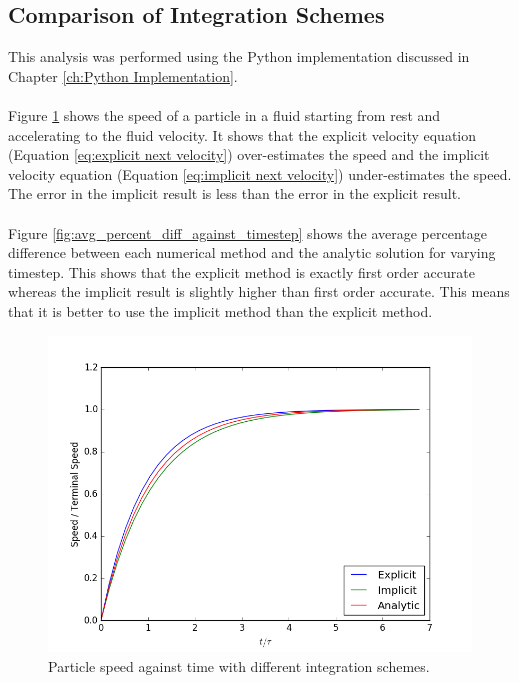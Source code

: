 \documentclass[a4paper,11pt,titlepage]{report}
\begin{document}
\subsection{Comparison of Integration Schemes}
\label{sec:integration scheme comparison}
This analysis was performed using the Python implementation discussed in Chapter \ref{ch:Python Implementation}.
\\\\Figure \ref{fig:terminal_velocity_implicit_explicit} shows the speed of a particle in a fluid starting from rest and accelerating to the fluid velocity. It shows that the explicit velocity equation (Equation \ref{eq:explicit next velocity}) over-estimates the speed and the implicit velocity equation (Equation \ref{eq:implicit next velocity}) under-estimates the speed. The error in the implicit result is less than the error in the explicit result.
\\\\Figure \ref{fig:avg_percent_diff_against_timestep} shows the average percentage difference between each numerical method and the analytic solution for varying timestep. This shows that the explicit method is exactly first order accurate whereas the implicit result is slightly higher than first order accurate. This means that it is better to use the implicit method than the explicit method.
\begin{figure}[!htb]
\centering
\includegraphics[scale=0.6]{figures/TerminalVelocityImplicitExplicit.png}
\caption{Particle speed against time with different integration schemes.}
\label{fig:terminal_velocity_implicit_explicit}
\end{figure}
\end{document}
